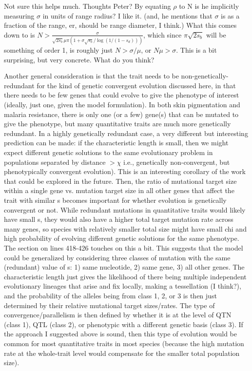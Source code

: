\documentclass[12pt,letterpaper]{article}
\newcommand{\gc}[1]{{ \color{red} #1}}
\newcommand{\plr}[1]{{ \color{green} #1}}
\begin{document}
\gc{Not sure this helps much. Thoughts Peter? By equating $\rho$ to N is he implicitly measuring $\sigma$ in units of range radius?}
\plr{I like it.  (and, he mentions that $\sigma$ is as a fraction of the range, er, should be range diameter, I think.)
What this comes down to is $N > \frac{ \sigma }{ \sqrt{2 s_b} \mu \pi ( 1 + \sigma \sqrt{s_b}/\log(1/(1-s_d)))}$,
which since $\pi \sqrt{2s_b}$ will be something of order 1, is roughly just $N > \sigma/\mu$, or $N \mu > \sigma$.
This is a bit surprising, but very concrete.  What do you think?
}

Another general consideration is that the trait needs to be non-genetically-redundant for the kind of genetic convergent evolution discussed here, in that there needs to be few genes that could evolve to give the phenotype of interest (ideally, just one, given the model formulation). In both skin pigmentation and malaria resistance, there is only one (or a few) gene(s) that can be mutated to give the phenotype, but many quantitative traits are much more genetically redundant. In a highly genetically redundant case, a very different but interesting prediction can be made: if the characteristic length is small, then we might expect different genetic solutions to the same evolutionary problem in populations separated by distance $> \chi$ i.e., genetically non-convergent, but phenotypically convergent evolution). This is an interesting corollary of the work that could be explored in the future. Then, the ratio of {mutational target size within a single gene} vs. {mutation target size in all other genes that affect the trait with similar s} becomes important for whether evolution is genetically convergent or not. While redundant mutations in quantitative traits would likely have small s, they would also have a higher total target mutation rate across many genes, so species with relatively smaller total size might have small chi and high probability of evolving different genetic solutions for the same phenotype. The section on lines 418-426 touches on this a bit. This suggests that the model could be generalized by considering three classes of mutation with the same (redundant) value of s: 1) same nucleotide, 2) same gene, 3) all other genes. The characteristic length just gives the likelihood of there being multiple independent evolutionary lineages that arise and fix locally, making a tessellation (I think?), and the probability of the alleles being from class 1, 2, or 3 is then just determined by their relative mutational target sizes/rates. The type of convergence/parallelism is then defined by whether it is at the level of QTN (class 1), QTL (class 2), or phenotypic with a different genetic basis (class 3). If the approach I suggested above is sound, then this type of evolution would be common for most quantitative traits in most species (because the high mutation rate at the whole-trait level would compensate for the smaller total population size).
\end{document}
